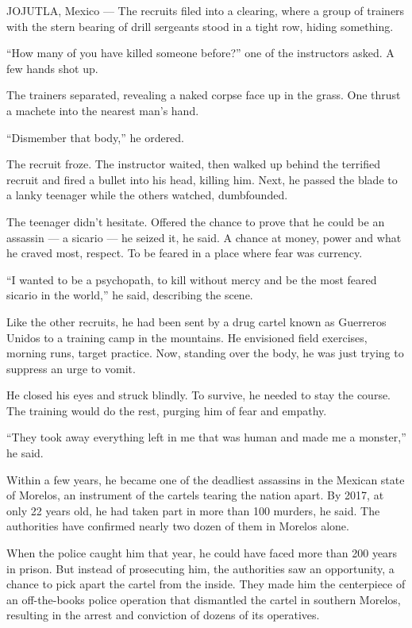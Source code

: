 JOJUTLA, Mexico --- The recruits filed into a clearing, where a group of
trainers with the stern bearing of drill sergeants stood in a tight row,
hiding something.

``How many of you have killed someone before?'' one of the instructors
asked. A few hands shot up.

The trainers separated, revealing a naked corpse face up in the grass.
One thrust a machete into the nearest man's hand.

``Dismember that body,'' he ordered.

The recruit froze. The instructor waited, then walked up behind the
terrified recruit and fired a bullet into his head, killing him. Next,
he passed the blade to a lanky teenager while the others watched,
dumbfounded.

The teenager didn't hesitate. Offered the chance to prove that he could
be an assassin --- a sicario --- he seized it, he said. A chance at
money, power and what he craved most, respect. To be feared in a place
where fear was currency.

``I wanted to be a psychopath, to kill without mercy and be the most
feared sicario in the world,'' he said, describing the scene.

Like the other recruits, he had been sent by a drug cartel known as
Guerreros Unidos to a training camp in the mountains. He envisioned
field exercises, morning runs, target practice. Now, standing over the
body, he was just trying to suppress an urge to vomit.

He closed his eyes and struck blindly. To survive, he needed to stay the
course. The training would do the rest, purging him of fear and empathy.

``They took away everything left in me that was human and made me a
monster,'' he said.

Within a few years, he became one of the deadliest assassins in the
Mexican state of Morelos, an instrument of the cartels tearing the
nation apart. By 2017, at only 22 years old, he had taken part in more
than 100 murders, he said. The authorities have confirmed nearly two
dozen of them in Morelos alone.

When the police caught him that year, he could have faced more than 200
years in prison. But instead of prosecuting him, the authorities saw an
opportunity, a chance to pick apart the cartel from the inside. They
made him the centerpiece of an off-the-books police operation that
dismantled the cartel in southern Morelos, resulting in the arrest and
conviction of dozens of its operatives.

